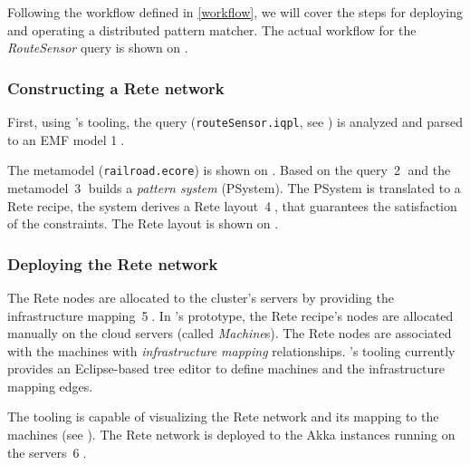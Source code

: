 Following the workflow defined in \autoref{workflow}, we will cover the steps for deploying and operating a distributed pattern matcher. The actual workflow for the \textit{RouteSensor} query is shown on .

\subsubsection{Constructing a Rete network}

First, using \eiq{}'s tooling, the query (\texttt{routeSensor.iqpl}, see ) is analyzed and parsed to an EMF model %
\textcircled{1}.


The metamodel (\texttt{railroad.ecore}) is shown on . Based on the query~\textcircled{2} and the metamodel~\textcircled{3} \eiq{} builds a \emph{pattern system} (PSystem). The PSystem is translated to a Rete recipe, the system derives a Rete layout~\textcircled{4}, that guarantees the satisfaction of the constraints. The Rete layout is shown on .


\subsubsection{Deploying the Rete network}

The Rete nodes are allocated to the cluster's servers by providing the infrastructure mapping~\textcircled{5}. 
In \iqd{}'s prototype, the Rete recipe's nodes are allocated manually on the cloud servers (called \textit{Machine}s). The Rete nodes are associated with the machines with \textit{infrastructure mapping} relationships. \iqd{}'s tooling currently provides an Eclipse-based tree editor to define machines and the infrastructure mapping edges.%

The tooling is capable of visualizing the Rete network and its mapping to the machines (see ).
The Rete network is deployed to the Akka instances running on the servers~\textcircled{6}.


